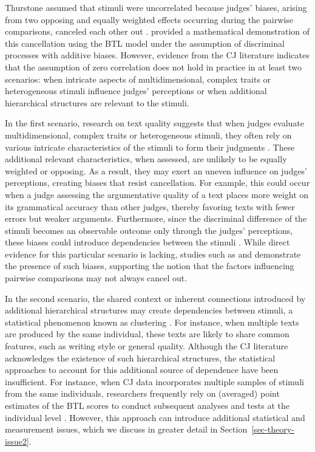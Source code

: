 \documentclass[
  authoryear,
  review,
  1p]{elsarticle}
\begin{document}
Thurstone assumed that stimuli were uncorrelated because judges' biases,
arising from two opposing and equally weighted effects occurring during
the pairwise comparisons, canceled each other out
\citep[pp.~268]{Thurstone_1927b}. \citet{Andrich_1978} provided a
mathematical demonstration of this cancellation using the BTL model
under the assumption of discriminal processes with additive biases.
However, evidence from the CJ literature indicates that the assumption
of zero correlation does not hold in practice in at least two scenarios:
when intricate aspects of multidimensional, complex traits or
heterogeneous stimuli influence judges' perceptions or when additional
hierarchical structures are relevant to the stimuli.

In the first scenario, research on text quality suggests that when
judges evaluate multidimensional, complex traits or heterogeneous
stimuli, they often rely on various intricate characteristics of the
stimuli to form their judgments
\citep{vanDaal_et_al_2016, Lesterhuis_2018, Chambers_et_al_2022}. These
additional relevant characteristics, when assessed, are unlikely to be
equally weighted or opposing. As a result, they may exert an uneven
influence on judges' perceptions, creating biases that resist
cancellation. For example, this could occur when a judge assessing the
argumentative quality of a text places more weight on its grammatical
accuracy than other judges, thereby favoring texts with fewer errors but
weaker arguments. Furthermore, since the discriminal difference of the
stimuli becomes an observable outcome only through the judges'
perceptions, these biases could introduce dependencies between the
stimuli \citep[pp.~346]{vanderLinden_et_al_2017_II}. While direct
evidence for this particular scenario is lacking, studies such as
\citet{Pollitt_et_al_2003} and \citet{vanDaal_et_al_2016} demonstrate
the presence of such biases, supporting the notion that the factors
influencing pairwise comparisons may not always cancel out.

In the second scenario, the shared context or inherent connections
introduced by additional hierarchical structures may create dependencies
between stimuli, a statistical phenomenon known as clustering
\citep[pp.~86]{Everitt_et_al_2010}. For instance, when multiple texts
are produced by the same individual, these texts are likely to share
common features, such as writing style or general quality. Although the
CJ literature acknowledges the existence of such hierarchical
structures, the statistical approaches to account for this additional
source of dependence have been insufficient. For instance, when CJ data
incorporates multiple samples of stimuli from the same individuals,
researchers frequently rely on (averaged) point estimates of the BTL
scores to conduct subsequent analyses and tests at the individual level
\citep{Bramley_et_al_2019, Boonen_et_al_2020, Bouwer_et_al_2023, vanDaal_et_al_2017, Jones_et_al_2019, Gijsen_et_al_2021}.
However, this approach can introduce additional statistical and
measurement issues, which we discuss in greater detail in
Section~\ref{sec-theory-issue2}.
\end{document}
